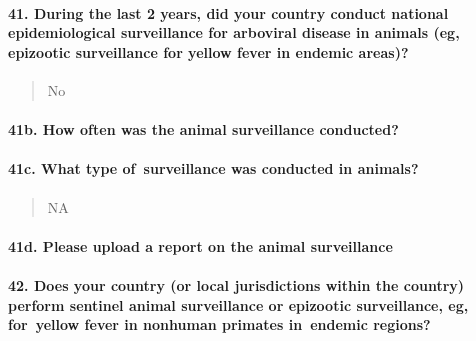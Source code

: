 \documentclass[
]{article}
\begin{document}
\hypertarget{during-the-last-2-years-did-your-country-conduct-national-epidemiological-surveillance-for-arboviral-disease-in-animals-eg-epizootic-surveillance-for-yellow-fever-in-endemic-areas}{%
\paragraph{41. During the last 2 years, did your country conduct
national epidemiological surveillance for arboviral disease in animals
(eg, epizootic surveillance for yellow fever in endemic
areas)?}\label{during-the-last-2-years-did-your-country-conduct-national-epidemiological-surveillance-for-arboviral-disease-in-animals-eg-epizootic-surveillance-for-yellow-fever-in-endemic-areas}}

\begin{quote}
No
\end{quote}

\hypertarget{b.-how-often-was-the-animal-surveillance-conducted}{%
\paragraph{41b. How often was the animal surveillance
conducted?}\label{b.-how-often-was-the-animal-surveillance-conducted}}

\begin{quote}
\end{quote}

\hypertarget{c.-what-type-of-surveillance-was-conducted-in-animals}{%
\paragraph{41c. What type of~surveillance was conducted in
animals?}\label{c.-what-type-of-surveillance-was-conducted-in-animals}}

\begin{quote}
NA
\end{quote}

\hypertarget{d.-please-upload-a-report-on-the-animal-surveillance}{%
\paragraph{41d. Please upload a report on the animal
surveillance}\label{d.-please-upload-a-report-on-the-animal-surveillance}}

\begin{quote}
\end{quote}

\hypertarget{does-your-country-or-local-jurisdictions-within-the-country-perform-sentinel-animal-surveillance-or-epizootic-surveillance-eg-for-yellow-fever-in-nonhuman-primates-in-endemic-regions}{%
\paragraph{42. Does your country (or local jurisdictions within the
country) perform sentinel animal surveillance or epizootic surveillance,
eg, for~yellow fever in nonhuman primates in~endemic
regions?}\label{does-your-country-or-local-jurisdictions-within-the-country-perform-sentinel-animal-surveillance-or-epizootic-surveillance-eg-for-yellow-fever-in-nonhuman-primates-in-endemic-regions}}
\end{document}
